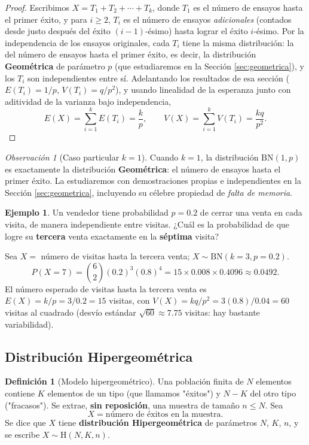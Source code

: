 \documentclass[11pt,a4paper]{article}
\theoremstyle{plain}
\theoremstyle{definition}
\newtheorem{definicion}[teorema]{Definición}
\newtheorem{ejemplo}[teorema]{Ejemplo}
\theoremstyle{remark}
\newtheorem{observacion}[teorema]{Observación}
\begin{document}
\begin{proof}
Escribimos $X=T_1+T_2+\cdots+T_k$, donde $T_1$ es el número de ensayos hasta el primer éxito, y para $i\ge2$, $T_i$ es el número de ensayos \emph{adicionales} (contados desde justo después del éxito $(i-1)$-ésimo) hasta lograr el éxito $i$-ésimo. Por la independencia de los ensayos originales, cada $T_i$ tiene la misma distribución: la del número de ensayos hasta el primer éxito, es decir, la distribución \textbf{Geométrica} de parámetro $p$ (que estudiaremos en la Sección \ref{sec:geometrica}), y los $T_i$ son independientes entre sí. Adelantando los resultados de esa sección ($E(T_i)=1/p$, $V(T_i)=q/p^2$), y usando linealidad de la esperanza junto con aditividad de la varianza bajo independencia,
$$E(X)=\sum_{i=1}^k E(T_i)=\frac{k}{p}, \qquad V(X)=\sum_{i=1}^k V(T_i)=\frac{kq}{p^2}.$$
\end{proof}

\begin{observacion}[Caso particular $k=1$]
Cuando $k=1$, la distribución $\text{BN}(1,p)$ es exactamente la distribución \textbf{Geométrica}: el número de ensayos hasta el primer éxito. La estudiaremos con demostraciones propias e independientes en la Sección \ref{sec:geometrica}, incluyendo su célebre propiedad de \emph{falta de memoria}.
\end{observacion}

\begin{ejemplo}
Un vendedor tiene probabilidad $p=0.2$ de cerrar una venta en cada visita, de manera independiente entre visitas. ¿Cuál es la probabilidad de que logre su \textbf{tercera} venta exactamente en la \textbf{séptima} visita?

Sea $X=$ número de visitas hasta la tercera venta; $X\sim\text{BN}(k=3,p=0.2)$.
$$P(X=7)=\binom{6}{2}(0.2)^3(0.8)^4=15\times0.008\times0.4096\approx0.0492.$$
El número esperado de visitas hasta la tercera venta es $E(X)=k/p=3/0.2=15$ visitas, con $V(X)=kq/p^2=3(0.8)/0.04=60$ visitas al cuadrado (desvío estándar $\sqrt{60}\approx7.75$ visitas: hay bastante variabilidad).
\end{ejemplo}

\subsection{Distribución Hipergeométrica}

\begin{definicion}[Modelo hipergeométrico]
Una población finita de $N$ elementos contiene $K$ elementos de un tipo (que llamamos "éxitos") y $N-K$ del otro tipo ("fracasos"). Se extrae, \textbf{sin reposición}, una muestra de tamaño $n\le N$. Sea
$$X=\text{número de éxitos en la muestra}.$$
Se dice que $X$ tiene \textbf{distribución Hipergeométrica} de parámetros $N$, $K$, $n$, y se escribe $X\sim\text{H}(N,K,n)$.
\end{definicion}
\end{document}
